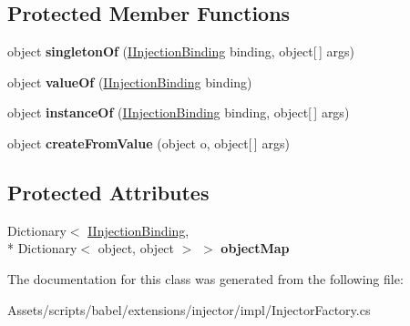\subsection*{Protected Member Functions}
\begin{DoxyCompactItemize}
\item 
\hypertarget{classbabel_1_1extensions_1_1injector_1_1impl_1_1_injector_factory_adac7a54277dcae8ac9630775eb6280d5}{object {\bfseries singleton\-Of} (\hyperlink{interfacebabel_1_1extensions_1_1injector_1_1api_1_1_i_injection_binding}{I\-Injection\-Binding} binding, object\mbox{[}$\,$\mbox{]} args)}\label{classbabel_1_1extensions_1_1injector_1_1impl_1_1_injector_factory_adac7a54277dcae8ac9630775eb6280d5}

\item 
\hypertarget{classbabel_1_1extensions_1_1injector_1_1impl_1_1_injector_factory_a46ef022f6d102581b170c937a8981f2a}{object {\bfseries value\-Of} (\hyperlink{interfacebabel_1_1extensions_1_1injector_1_1api_1_1_i_injection_binding}{I\-Injection\-Binding} binding)}\label{classbabel_1_1extensions_1_1injector_1_1impl_1_1_injector_factory_a46ef022f6d102581b170c937a8981f2a}

\item 
\hypertarget{classbabel_1_1extensions_1_1injector_1_1impl_1_1_injector_factory_accefdc2cae40cbb54d609acdfa143d15}{object {\bfseries instance\-Of} (\hyperlink{interfacebabel_1_1extensions_1_1injector_1_1api_1_1_i_injection_binding}{I\-Injection\-Binding} binding, object\mbox{[}$\,$\mbox{]} args)}\label{classbabel_1_1extensions_1_1injector_1_1impl_1_1_injector_factory_accefdc2cae40cbb54d609acdfa143d15}

\item 
\hypertarget{classbabel_1_1extensions_1_1injector_1_1impl_1_1_injector_factory_a75fd1b41ef064f305bcd26e3ec36843a}{object {\bfseries create\-From\-Value} (object o, object\mbox{[}$\,$\mbox{]} args)}\label{classbabel_1_1extensions_1_1injector_1_1impl_1_1_injector_factory_a75fd1b41ef064f305bcd26e3ec36843a}

\end{DoxyCompactItemize}
\subsection*{Protected Attributes}
\begin{DoxyCompactItemize}
\item 
\hypertarget{classbabel_1_1extensions_1_1injector_1_1impl_1_1_injector_factory_afb4121f9e78e72ae8fd2a35411633bd6}{Dictionary$<$ \hyperlink{interfacebabel_1_1extensions_1_1injector_1_1api_1_1_i_injection_binding}{I\-Injection\-Binding}, \\*
Dictionary$<$ object, object $>$ $>$ {\bfseries object\-Map}}\label{classbabel_1_1extensions_1_1injector_1_1impl_1_1_injector_factory_afb4121f9e78e72ae8fd2a35411633bd6}

\end{DoxyCompactItemize}


The documentation for this class was generated from the following file\-:\begin{DoxyCompactItemize}
\item 
Assets/scripts/babel/extensions/injector/impl/Injector\-Factory.\-cs\end{DoxyCompactItemize}
